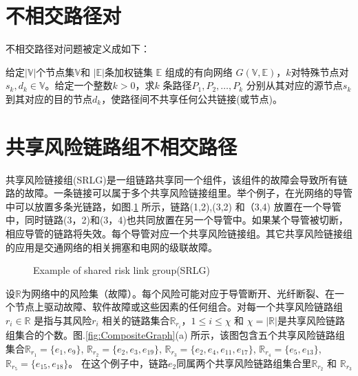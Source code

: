 \section{不相交路径对}
不相交路径对问题被定义成如下：

\begin{definition}[不相交路径对]
给定$|\mathbb{V}|$个节点集$\mathbb{V}$和 $|\mathbb{E}|$条加权链集 $\mathbb{E}$ 组成的有向网络 $G(\mathbb{V},\mathbb{E})$，$k$对特殊节点对$s_k,d_k\in\mathbb{V}$。给定一个整数$k>0$，求$k$ 条路径$P_1,P_2,\ldots,P_k$ 分别从其对应的源节点$s_k$到其对应的目的节点$d_k$，使路径间不共享任何公共链接(或节点)。
\end{definition}

\section{共享风险链路组不相交路径}

共享风险链接组(SRLG)是一组链路共享同一个组件，该组件的故障会导致所有链路的故障。一条链接可以属于多个共享风险链接组里。举个例子，在光网络的导管中\cite{bhandari1994optimal}可以放置多条光链路，如图.\ref{fig:Logic shift operation} 所示，链路(1,2),(3,2) 和（3,4) 放置在一个导管中，同时链路(3，2)和(3，4)也共同放置在另一个导管中。如果某个导管被切断，相应导管的链路将失效。每个导管对应一个共享风险链接组。其它共享风险链接组的应用是交通网络的相关拥塞和电网的级联故障\cite{coudert2007shared}。


\begin{figure}[htbp]
\centering
{}
\caption{Example of shared risk link group(SRLG)}\label{fig:SRLGgraph}
\label{fig:Logic shift operation}
\end{figure}

设$\mathbb{R}$为网络中的风险集（故障）。每个风险可能对应于导管断开、光纤断裂、在一个节点上驱动故障、软件故障或这些因素的任何组合。对每一个共享风险链路组$r_i \in \mathbb{R}$ 是指与其风险$r_i$ 相关的链路集合$\mathbb{R}_{r_i}$，$1\leq i\leq \chi$ 和 $\chi=|{\mathbb{R}}|$是共享风险链路组集合的个数。图.\ref{fig:CompositeGraph}(a) 所示，该图包含五个共享风险链路组集合$\mathbb{R}_{r_1}=\{e_1,e_9\}$, $\mathbb{R}_{r_2}=\{e_2,e_3,e_{19}\}$, $\mathbb{R}_{r_3}=\{e_2,e_4,e_{11},e_{17}\}$, $\mathbb{R}_{r_4}=\{e_5,e_{13}\}$, $\mathbb{R}_{r_5}=\{e_{15},e_{18}\}$。 在这个例子中，链路$e_2$同属两个共享风险链路组集合里$\mathbb{R}_{r_2}$ 和 $\mathbb{R}_{r_3}$


